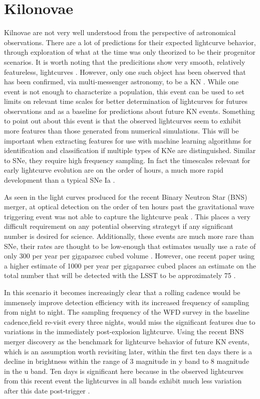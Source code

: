 \documentclass[12pt]{article}
\begin{document}
\section{Kilonovae} %
Kilnovae are not very well understood from the perspective of astronomical observations. There are a lot of predictions for their expected lightcurve behavior, through exploration of what at the time was only theorized to be their progenitor scenarios. It is worth noting that the predicitions show very smooth, relatively featureless, lightcurves \citep{Rosswog2016a}. However, only one such object has been observed that has been confirmed, via multi-messenger astronomy, to be a KN \citep{Kasliwal2017}. While one event is not enough to characterize a population, this event can be used to set limits on relevant time scales for better determination of lightcurves for futures observations and as a baseline for predictions about future KN events. Something to point out about this event is that the observed lightcurves seem to exhibit more features than those generated from numerical simulations. This will be important when extracting features for use with machine learning algorithms for identification and classification if multiple types of KNe are distinguished. Similar to SNe, they require high frequency sampling. In fact the timescales relevant for early lightcurve evolution are on the order of hours, a much more rapid development than a typical SNe Ia \citep{Villar2017}. \par
As seen in the light curves produced for the recent Binary Neutron Star (BNS) merger, at optical detection on the order of ten hours past the gravitational wave triggering event was not able to capture the lightcurve peak \citep{Villar2017}. This places a very difficult requirement on any potential observing strategyt if any significant number is desired for science. Additionally, these events are much more rare than SNe, their rates are thought to be low-enough that estimates usually use a rate of only 300 per year per gigaparsec cubed volume \citep{Rosswog2016a}. However, one recent paper using a higher estimate of 1000 per year per gigaparsec cubed places an estimate on the total number that will be detected with the LSST to be approximately 75 \citep{Scolnic2017}.\par
In this scenario it becomes increasingly clear that a rolling cadence would be immensely improve detection efficiency with its increased frequency of sampling from night to night. The sampling frequency of the WFD survey in the baseline cadence,field re-visit every three nights, would miss the significant features due to variations in the immediately post-explosion lightcurve. Using the recent BNS merger discovery as the benchmark for lightcurve behavior of future KN events, which is an assumption worth revisiting later, within the first ten days there is a decline in brightness within the range of 3 magnitude in y band to 8 magnitude in the u band. Ten days is significant here because in the observed lightcurves from this recent event the lightcurves in all bands exhibit much less variation after this date post-trigger \citep{Villar2017}. \par
\end{document}
